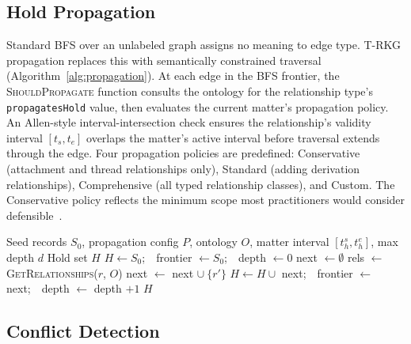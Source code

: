 \documentclass{ieeeaccess}
\begin{document}
\subsection{Hold Propagation}

Standard BFS over an unlabeled graph assigns no meaning to edge type. T-RKG propagation replaces this with semantically constrained traversal (Algorithm~\ref{alg:propagation}). At each edge in the BFS frontier, the \textsc{ShouldPropagate} function consults the ontology for the relationship type's \texttt{propagatesHold} value, then evaluates the current matter's propagation policy. An Allen-style interval-intersection check ensures the relationship's validity interval $[t_s, t_e]$ overlaps the matter's active interval before traversal extends through the edge. Four propagation policies are predefined: Conservative (attachment and thread relationships only), Standard (adding derivation relationships), Comprehensive (all typed relationship classes), and Custom. The Conservative policy reflects the minimum scope most practitioners would consider defensible~\cite{arnott2005}.

\begin{algorithm}[t]
\caption{Semantic Hold Propagation}
\label{alg:propagation}
\begin{algorithmic}[1]
\Require Seed records $S_0$, propagation config $P$, ontology $O$, matter interval $[t_h^s, t_h^e]$, max depth $d$
\Ensure Hold set $H$
\State $H \gets S_0$;\ \ frontier $\gets S_0$;\ \ depth $\gets 0$
    \State next $\gets \emptyset$
        \State rels $\gets$ \textsc{GetRelationships}($r$, $O$)
                \State next $\gets$ next $\cup\ \{r'\}$
            \EndIf
        \EndFor
    \EndFor
    \State $H \gets H \cup$ next;\ \ frontier $\gets$ next;\ \ depth $\gets$ depth $+ 1$
\EndWhile
\State \Return $H$
\end{algorithmic}
\end{algorithm}

\subsection{Conflict Detection}
\end{document}
